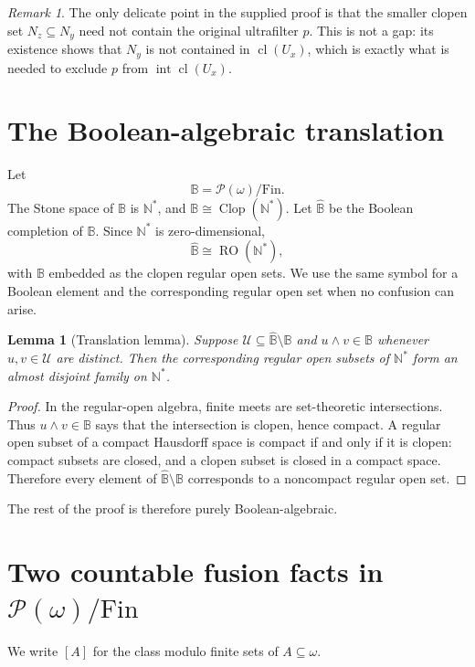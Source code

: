 \documentclass[11pt]{article}
\newtheorem{lemma}[theorem]{Lemma}
\theoremstyle{definition}
\theoremstyle{remark}
\newtheorem{remark}[theorem]{Remark}
\newcommand{\B}{\mathbb B}
\newcommand{\wideB}{\widehat{\mathbb B}}
\newcommand{\Fin}{\mathrm{Fin}}
\newcommand{\RO}{\operatorname{RO}}
\newcommand{\Clop}{\operatorname{Clop}}
\newcommand{\Int}{\operatorname{int}}
\newcommand{\cl}{\operatorname{cl}}
\newcommand{\calU}{\mathcal U}
\begin{document}
\begin{remark}
The only delicate point in the supplied proof is that the smaller clopen set
\(N_z\subseteq N_y\) need not contain the original ultrafilter \(p\).  This is
not a gap: its existence shows that \(N_y\) is not contained in
\(\cl(U_x)\), which is exactly what is needed to exclude
\(p\) from \(\Int\cl(U_x)\).
\end{remark}

\section{The Boolean-algebraic translation}

Let
\[
  \B=\mathcal P(\omega)/\Fin.
\]
The Stone space of \(\B\) is \(\mathbb N^*\), and
\(\B\cong\Clop(\mathbb N^*)\).  Let \(\wideB\) be the Boolean completion of
\(\B\).  Since \(\mathbb N^*\) is zero-dimensional,
\[
  \wideB\cong\RO(\mathbb N^*),
\]
with \(\B\) embedded as the clopen regular open sets.  We use the same symbol
for a Boolean element and the corresponding regular open set when no confusion
can arise.

\begin{lemma}[Translation lemma]\label{lem:translation}
Suppose \(\calU\subseteq\wideB\setminus\B\) and
\(u\wedge v\in\B\) whenever \(u,v\in\calU\) are distinct.  Then the
corresponding regular open subsets of \(\mathbb N^*\) form an almost disjoint
family on \(\mathbb N^*\).
\end{lemma}

\begin{proof}
In the regular-open algebra, finite meets are set-theoretic intersections.
Thus \(u\wedge v\in\B\) says that the intersection is clopen, hence compact.
A regular open subset of a compact Hausdorff space is compact if and only if it
is clopen: compact subsets are closed, and a clopen subset is closed in a
compact space.  Therefore every element of \(\wideB\setminus\B\) corresponds
to a noncompact regular open set.
\end{proof}

The rest of the proof is therefore purely Boolean-algebraic.

\section{Two countable fusion facts in
\texorpdfstring{\(\mathcal P(\omega)/\mathrm{Fin}\)}{P(omega)/Fin}}

We write \([A]\) for the class modulo finite sets of \(A\subseteq\omega\).
\end{document}
